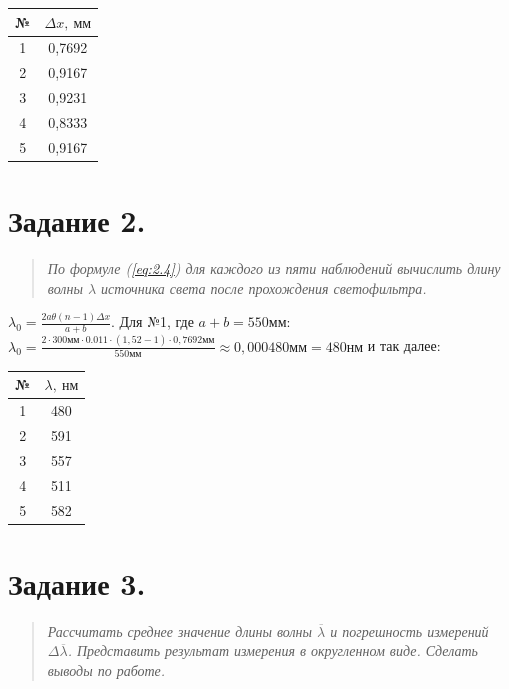 \begin{table}[H]
    \centering
    \begin{tabular}{ c c }
        № & $\Delta x,~\text{мм}$ \\
        \midrule
        1 & 0,7692 \\
        2 & 0,9167 \\
        3 & 0,9231 \\
        4 & 0,8333 \\
        5 & 0,9167 \\
    \end{tabular}
\end{table}


\section*{Задание 2.}
\begin{quote}
    \textit{
        По формуле (\ref{eq:2.4}) для каждого из пяти наблюдений вычислить длину волны $\lambda$ источника света после прохождения светофильтра.
    }
\end{quote}

$\lambda_{0} = \frac{2a\theta(n-1)\Delta x}{a+b}$.
Для №1, где $a + b = 550\text{мм}$:
$
    \lambda_{0} = \frac{
        2\cdot 300\text{мм} \cdot 0.011 \cdot (1,52-1)\cdot 0,7692\text{мм}
    }{
        550\text{мм}
    }
    \approx
    0,000480\text{мм} = 480\text{нм}
$ и так далее:

\begin{table}[H]
    \centering
    \begin{tabular}{ c c }
        № & $\lambda,~\text{нм}$ \\
        \midrule
        1 & 480 \\
        2 & 591 \\
        3 & 557 \\
        4 & 511 \\
        5 & 582 \\
    \end{tabular}
\end{table}

\section*{Задание 3.}
\begin{quote}
    \textit{
        Рассчитать среднее значение длины волны $\overline\lambda$ и погрешность измерений $\Delta\overline\lambda$. Представить результат измерения в округленном виде. Сделать выводы по работе.
    }
\end{quote}

